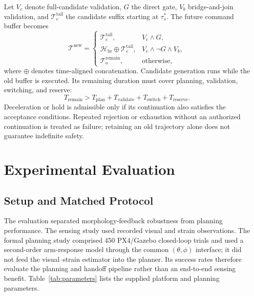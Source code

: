 \documentclass[journal,twoside]{IEEEtran}
\begin{document}
Let $V_c$ denote full-candidate validation, $G$ the direct gate, $V_b$ bridge-and-join validation, and $\mathcal T_c^{\mathrm{tail}}$ the candidate suffix starting at $\tau_s^*$. The future command buffer becomes
\begin{equation}
\mathcal T^{\mathrm{new}}=
\begin{cases}
\mathcal T_c^{\mathrm{tail}},&V_c\land G,\\
\mathcal H_{\mathrm{br}}\oplus\mathcal T_c^{\mathrm{tail}},&V_c\land\neg G\land V_b,\\
\mathcal T_o^{\mathrm{remain}},&\text{otherwise},
\end{cases}
\label{eq:cache}
\end{equation}
where $\oplus$ denotes time-aligned concatenation. Candidate generation runs while the old buffer is executed. Its remaining duration must cover planning, validation, switching, and reserve:
\begin{equation}
T_{\mathrm{remain}}>T_{\mathrm{plan}}+T_{\mathrm{validate}}
+T_{\mathrm{switch}}+T_{\mathrm{reserve}}.
\label{eq:buffer}
\end{equation}
Deceleration or hold is admissible only if its continuation also satisfies the acceptance conditions. Repeated rejection or exhaustion without an authorized continuation is treated as failure; retaining an old trajectory alone does not guarantee indefinite safety.

\section{Experimental Evaluation}\label{sec:experiments}
\subsection{Setup and Matched Protocol}
The evaluation separated morphology-feedback robustness from planning performance. The sensing study used recorded visual and strain observations. The formal planning study comprised 450 PX4/Gazebo closed-loop trials and used a second-order arm-response model through the common $(\theta,\phi)$ interface; it did not feed the visual--strain estimator into the planner. Its success rates therefore evaluate the planning and handoff pipeline rather than an end-to-end sensing benefit. Table~\ref{tab:parameters} lists the supplied platform and planning parameters.
\end{document}
